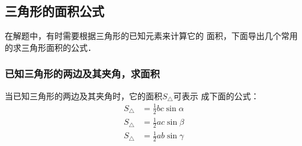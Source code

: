 \subsection{三角形的面积公式}
在解题中，有时需要根据三角形的已知元素来计算它的
面积，下面导出几个常用的求三角形面积的公式．

\subsubsection{已知三角形的两边及其夹角，求面积}

当已知三角形的两边及其夹角时，它的面积$S_{\triangle}$可表示
成下面的公式：
\[\begin{split}
    S_{\triangle}&=\frac{1}{2} bc\sin\alpha\\
S_{\triangle}&=\frac{1}{2} ac\sin\beta\\
S_{\triangle}&=\frac{1}{2}ab\sin\gamma\\
\end{split}\]

